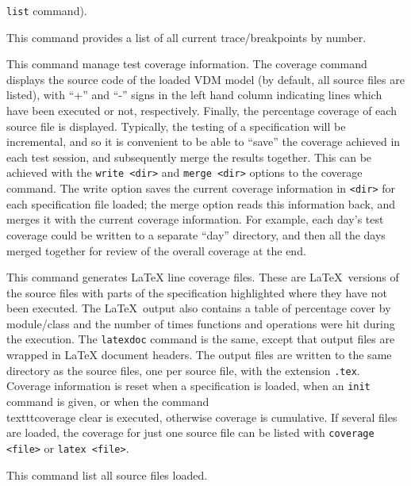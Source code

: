 \documentclass{overturerepchap}
\begin{document}
\begin{description}
  \texttt{list} command).  
\item[\texttt{list}:] This command provides a list of all current
  trace/breakpoints by number.  
\item[\texttt{coverage [clear|write <dir>|merge <dir>|<filenames>]}:]
  This command manage test coverage information. The coverage command displays the source
  code of the loaded VDM model (by default, all source files are
  listed), with ``+'' and ``-'' signs in the left hand column
  indicating lines which have been executed or not,
  respectively. Finally, the percentage coverage of each source file
  is displayed. Typically, the
  testing of a specification will be incremental, and so it is
  convenient to be able to ``save'' the coverage achieved in each test
  session, and subsequently merge the results together. This can be
  achieved with the \texttt{write <dir>} and \texttt{merge <dir>} options to the
  coverage command. The write option saves the current coverage
  information in \texttt{<dir>} for each specification file loaded; the merge
  option reads this information back, and merges it with the current
  coverage information. For example, each day's test coverage could be
  written to a separate ``day'' directory, and then all the days merged
  together for review of the overall coverage at the end.
\item[\texttt{latex|latexdoc [<files>]}:] This command generates LaTeX
  line coverage files. These are \LaTeX\ versions of the source files
  with parts of the
  specification highlighted where they have not been executed. The
  \LaTeX\ output also contains a table of percentage cover by
  module/class and the number of times functions and operations were
  hit during the execution. The \texttt{latexdoc} command is the same,
  except that output files are wrapped in LaTeX document headers. The
  output files are written to the same directory as the source files, one
  per source file, with the extension \texttt{.tex}. Coverage
  information is reset when a specification is loaded, when an \texttt{init}
  command is given, or when the
  command \\texttt{coverage clear} is executed, otherwise coverage is
  cumulative. If several files are loaded, the coverage for just one
  source file can be listed with \texttt{coverage <file>} or
  \texttt{latex <file>}.  
\item[\texttt{files}:] This command list all source files loaded.

\end{description}
\end{document}
